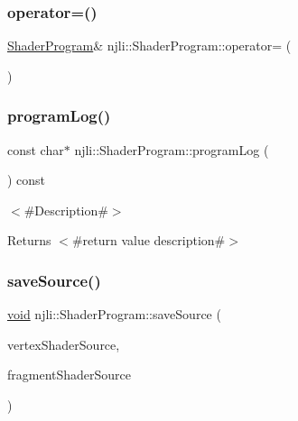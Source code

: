 \subsubsection{\texorpdfstring{operator=()}{operator=()}}
{\footnotesize\ttfamily \mbox{\hyperlink{classnjli_1_1_shader_program}{Shader\+Program}}\& njli\+::\+Shader\+Program\+::operator= (\begin{DoxyParamCaption}\item[{const \mbox{\hyperlink{classnjli_1_1_shader_program}{Shader\+Program}} \&}]{ }\end{DoxyParamCaption})\hspace{0.3cm}{\ttfamily [protected]}}

\mbox{\label{classnjli_1_1_shader_program_a28dfbce737ee0481f6a8199a0b1b226f}} 
\subsubsection{\texorpdfstring{program\+Log()}{programLog()}}
{\footnotesize\ttfamily const char$\ast$ njli\+::\+Shader\+Program\+::program\+Log (\begin{DoxyParamCaption}{ }\end{DoxyParamCaption}) const}

$<$\#\+Description\#$>$

\begin{DoxyReturn}{Returns}
$<$\#return value description\#$>$ 
\end{DoxyReturn}
\mbox{\label{classnjli_1_1_shader_program_a302cf231b252535230e1eaa794c0dc3e}} 
\subsubsection{\texorpdfstring{save\+Source()}{saveSource()}}
{\footnotesize\ttfamily \mbox{\hyperlink{_thread_8h_af1e856da2e658414cb2456cb6f7ebc66}{void}} njli\+::\+Shader\+Program\+::save\+Source (\begin{DoxyParamCaption}\item[{const std\+::string \&}]{vertex\+Shader\+Source,  }\item[{const std\+::string \&}]{fragment\+Shader\+Source }\end{DoxyParamCaption})}


